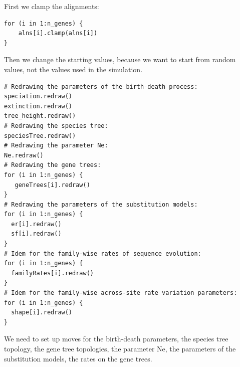 \documentclass[11pt]{article}
\begin{document}
{\begin{framed}
First we clamp the alignments:
{\tt \begin{snugshade*}
\begin{lstlisting}
for (i in 1:n_genes) {
	alns[i].clamp(alns[i])
}
\end{lstlisting}
\end{snugshade*}}

Then we change the starting values, because we want to start from random values, not the values used in the simulation.

{\tt \begin{snugshade*}
\begin{lstlisting}
# Redrawing the parameters of the birth-death process:
speciation.redraw()
extinction.redraw()
tree_height.redraw()
# Redrawing the species tree:
speciesTree.redraw()
# Redrawing the parameter Ne:
Ne.redraw()
# Redrawing the gene trees:
for (i in 1:n_genes) {
   geneTrees[i].redraw()
}
# Redrawing the parameters of the substitution models:
for (i in 1:n_genes) {
  er[i].redraw()
  sf[i].redraw()
}
# Idem for the family-wise rates of sequence evolution:
for (i in 1:n_genes) {
  familyRates[i].redraw()
}
# Idem for the family-wise across-site rate variation parameters:
for (i in 1:n_genes) {
  shape[i].redraw()
}
\end{lstlisting}
\end{snugshade*}}

We need to set up moves for the birth-death parameters, the species tree topology, the gene tree topologies, the parameter Ne, the parameters of the substitution models, the rates on the gene trees.


\end{framed}}
\end{document}
